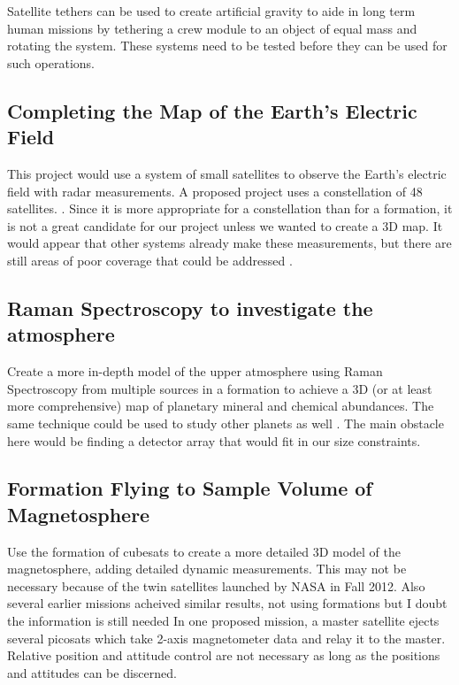 Satellite tethers can be used to create artificial gravity to aide in long term human missions by tethering a crew module to an object of equal mass and rotating the system. These systems need to be tested before they can be used for such operations. \cite{Ref:Carlson}\cite{Ref:Mazzoleni}

\subsection{Completing the Map of the Earth's Electric Field}

This project would use a system of small satellites to observe the Earth's electric field with radar measurements. A proposed project uses a constellation of 48 satellites. \cite{Ref:Redd}. Since it is more appropriate for a constellation than for a formation, it is not a great candidate for our project unless we wanted to create a 3D map. It would appear that other systems already make these measurements, but there are still areas of poor coverage that could be addressed \cite{Ref:ElecMap}. 

\subsection{Raman Spectroscopy to investigate the atmosphere}

Create a more in-depth model of the upper atmosphere using Raman Spectroscopy from multiple sources in a formation to achieve a 3D (or at least more comprehensive) map of planetary mineral and chemical abundances. The same technique could be used to study other planets as well \cite{Ref:Cantrell}. The main obstacle here would be finding a detector array that would fit in our size constraints. 

\subsection{Formation Flying to Sample Volume of Magnetosphere}

Use the formation of cubesats to create a more detailed 3D model of the magnetosphere, adding detailed dynamic measurements. This may not be necessary because of the twin satellites launched by NASA in Fall 2012. Also several earlier missions acheived similar results, not using formations but I doubt the information is still needed \cite{Ref:Mag3D} In one proposed mission, a master satellite ejects several picosats which take 2-axis magnetometer data and relay it to the master. Relative position and attitude control are not necessary as long as the positions and attitudes can be discerned.\cite{Ref:Clarke}

